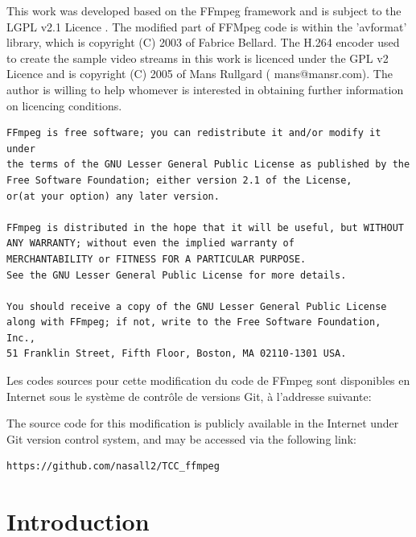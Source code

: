 \documentclass[12pt,a4paper]{article}
\begin{document}
\-\newline
This work was developed based on the FFmpeg\cite{ffmpeg} framework and is subject to the LGPL v2.1 Licence \cite{gplv2}. The modified part of FFMpeg code is within the 'avformat' library, which is copyright (C) 2003 of Fabrice Bellard. The H.264 encoder used to create the sample video streams in this work is licenced under the GPL v2 Licence and is copyright (C) 2005 of Mans Rullgard ( mans@mansr.com). The author is willing to help whomever is interested in obtaining further information on licencing conditions.

\-\newline
\begin{minipage}{\linewidth}
\begin{lstlisting}[]
FFmpeg is free software; you can redistribute it and/or modify it under
the terms of the GNU Lesser General Public License as published by the
Free Software Foundation; either version 2.1 of the License,
or(at your option) any later version.

FFmpeg is distributed in the hope that it will be useful, but WITHOUT
ANY WARRANTY; without even the implied warranty of
MERCHANTABILITY or FITNESS FOR A PARTICULAR PURPOSE.
See the GNU Lesser General Public License for more details.

You should receive a copy of the GNU Lesser General Public License
along with FFmpeg; if not, write to the Free Software Foundation, Inc.,
51 Franklin Street, Fifth Floor, Boston, MA 02110-1301 USA.
\end{lstlisting}
\end{minipage}

\-\newline
Les codes sources pour cette modification du code de FFmpeg sont disponibles en Internet sous le système de contrôle de versions Git, à l'addresse suivante:

\-\newline
The source code for this modification is publicly available in the Internet under Git version control system, and may be accessed via the following link:
\begin{verbatim}
https://github.com/nasall2/TCC_ffmpeg
\end{verbatim}


\newpage
\section{Introduction}
\end{document}
